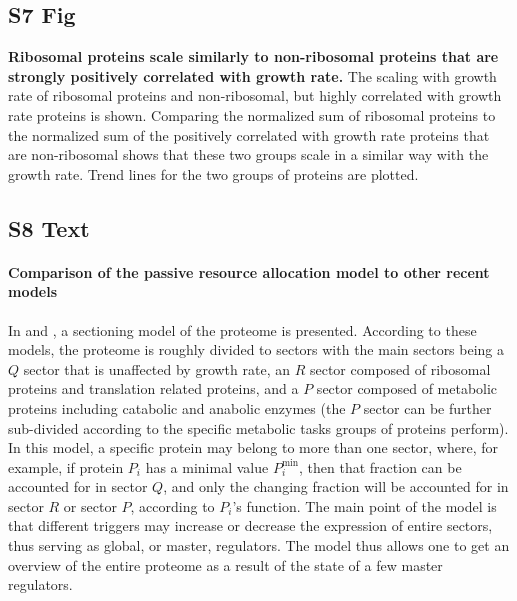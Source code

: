 \documentclass[10pt,letterpaper]{article}
\begin{document}
\subsection*{S7 Fig}
\label{fig:ribsnonribs}
    {\bf Ribosomal proteins scale similarly to non-ribosomal proteins that are strongly positively correlated with growth rate.}
 The scaling with growth rate of ribosomal proteins and non-ribosomal, but highly correlated with growth rate proteins is shown.
Comparing the normalized sum of ribosomal proteins to the normalized sum of the positively correlated with growth rate proteins that are non-ribosomal shows that these two groups scale in a similar way with the growth rate.
Trend lines for the two groups of proteins are plotted.
%

\subsection*{S8 Text}
\label{scottcompare}
\paragraph{Comparison of the passive resource allocation model to other recent models}
In \cite{Scott2010,Scott2011,Scott2014} and \cite{Hui_2015}, a sectioning model of the proteome is presented.
According to these models, the proteome is roughly divided to sectors with the main sectors being a $Q$ sector that is unaffected by growth rate, an $R$ sector composed of ribosomal proteins and translation related proteins, and a $P$ sector composed of metabolic proteins including catabolic and anabolic enzymes (the $P$ sector can be further sub-divided according to the specific metabolic tasks groups of proteins perform).
In this model, a specific protein may belong to more than one sector, where, for example, if protein $P_i$ has a minimal value $P_i^{\min}$, then that fraction can be accounted for in sector $Q$, and only the changing fraction will be accounted for in sector $R$ or sector $P$, according to $P_i$'s function.
The main point of the model is that different triggers may increase or decrease the expression of entire sectors, thus serving as global, or master, regulators.
The model thus allows one to get an overview of the entire proteome as a result of the state of a few master regulators.
\end{document}
